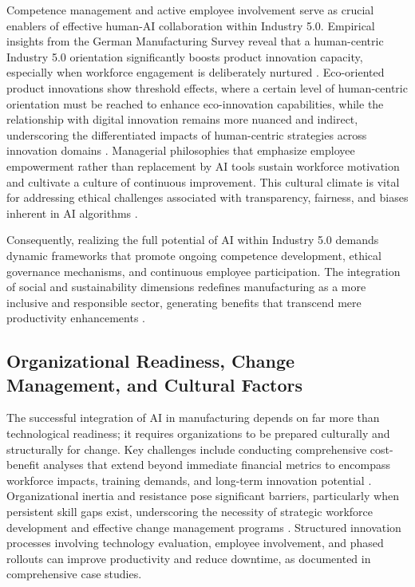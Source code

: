 \documentclass[sigconf]{acmart}
\begin{document}
Competence management and active employee involvement serve as crucial enablers of effective human-AI collaboration within Industry 5.0. Empirical insights from the German Manufacturing Survey reveal that a human-centric Industry 5.0 orientation significantly boosts product innovation capacity, especially when workforce engagement is deliberately nurtured \cite{ref6}. Eco-oriented product innovations show threshold effects, where a certain level of human-centric orientation must be reached to enhance eco-innovation capabilities, while the relationship with digital innovation remains more nuanced and indirect, underscoring the differentiated impacts of human-centric strategies across innovation domains \cite{ref7}. Managerial philosophies that emphasize employee empowerment rather than replacement by AI tools sustain workforce motivation and cultivate a culture of continuous improvement. This cultural climate is vital for addressing ethical challenges associated with transparency, fairness, and biases inherent in AI algorithms \cite{ref9,ref15,ref36}.

Consequently, realizing the full potential of AI within Industry 5.0 demands dynamic frameworks that promote ongoing competence development, ethical governance mechanisms, and continuous employee participation. The integration of social and sustainability dimensions redefines manufacturing as a more inclusive and responsible sector, generating benefits that transcend mere productivity enhancements \cite{ref38}.

\subsection{Organizational Readiness, Change Management, and Cultural Factors}

The successful integration of AI in manufacturing depends on far more than technological readiness; it requires organizations to be prepared culturally and structurally for change. Key challenges include conducting comprehensive cost-benefit analyses that extend beyond immediate financial metrics to encompass workforce impacts, training demands, and long-term innovation potential \cite{ref3}. Organizational inertia and resistance pose significant barriers, particularly when persistent skill gaps exist, underscoring the necessity of strategic workforce development and effective change management programs \cite{ref19}. Structured innovation processes involving technology evaluation, employee involvement, and phased rollouts can improve productivity and reduce downtime, as documented in comprehensive case studies.
\end{document}
